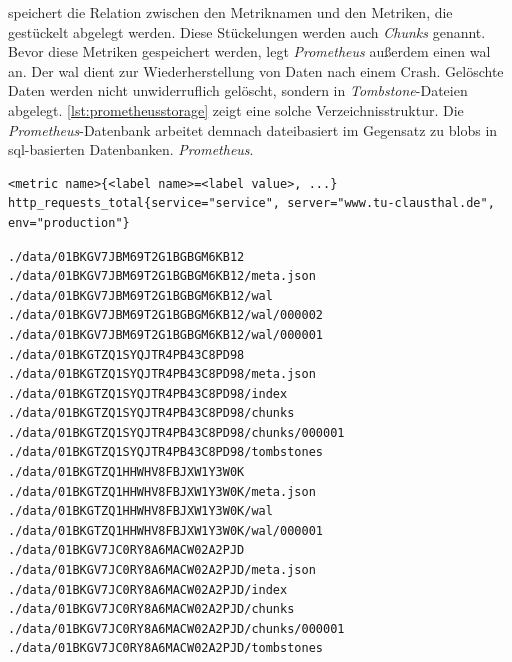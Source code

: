 \documentclass[titlepage]{report}
\begin{document}
speichert die Relation zwischen den Metriknamen und den Metriken, die
gestückelt abgelegt werden. Diese Stückelungen werden auch \emph{Chunks}
genannt\cite{PROMETHEUS_STORAGE}. Bevor diese Metriken gespeichert
werden, legt \emph{Prometheus} außerdem einen \gls{wal} an. Der \gls{wal}
dient zur Wiederherstellung von Daten nach einem Crash. Gelöschte Daten
werden nicht unwiderruflich gelöscht, sondern in
\emph{Tombstone}\hyp{}Dateien abgelegt. 
\autoref{lst:prometheusstorage} zeigt eine
solche Verzeichnisstruktur. Die \emph{Prometheus}\hyp{}Datenbank
arbeitet demnach dateibasiert im Gegensatz zu \glspl{blob} in
\gls{sql}\hyp{}basierten Datenbanken.
\emph{Prometheus}.
\begin{minipage}{\linewidth}
\begin{lstlisting}[caption={Prometheus Datenformat und
Beispiel},label={lst:prometheusdataformat}]
<metric name>{<label name>=<label value>, ...}
http_requests_total{service="service", server="www.tu-clausthal.de", env="production"}
\end{lstlisting}
\end{minipage}
\begin{minipage}{\linewidth}
\begin{lstlisting}[caption={Beispiel für das Prometheus Datenmodell},label={lst:prometheusstorage}]
./data/01BKGV7JBM69T2G1BGBGM6KB12
./data/01BKGV7JBM69T2G1BGBGM6KB12/meta.json
./data/01BKGV7JBM69T2G1BGBGM6KB12/wal
./data/01BKGV7JBM69T2G1BGBGM6KB12/wal/000002
./data/01BKGV7JBM69T2G1BGBGM6KB12/wal/000001
./data/01BKGTZQ1SYQJTR4PB43C8PD98
./data/01BKGTZQ1SYQJTR4PB43C8PD98/meta.json
./data/01BKGTZQ1SYQJTR4PB43C8PD98/index
./data/01BKGTZQ1SYQJTR4PB43C8PD98/chunks
./data/01BKGTZQ1SYQJTR4PB43C8PD98/chunks/000001
./data/01BKGTZQ1SYQJTR4PB43C8PD98/tombstones
./data/01BKGTZQ1HHWHV8FBJXW1Y3W0K
./data/01BKGTZQ1HHWHV8FBJXW1Y3W0K/meta.json
./data/01BKGTZQ1HHWHV8FBJXW1Y3W0K/wal
./data/01BKGTZQ1HHWHV8FBJXW1Y3W0K/wal/000001
./data/01BKGV7JC0RY8A6MACW02A2PJD
./data/01BKGV7JC0RY8A6MACW02A2PJD/meta.json
./data/01BKGV7JC0RY8A6MACW02A2PJD/index
./data/01BKGV7JC0RY8A6MACW02A2PJD/chunks
./data/01BKGV7JC0RY8A6MACW02A2PJD/chunks/000001
./data/01BKGV7JC0RY8A6MACW02A2PJD/tombstones
\end{lstlisting}
\end{minipage}
\end{document}
